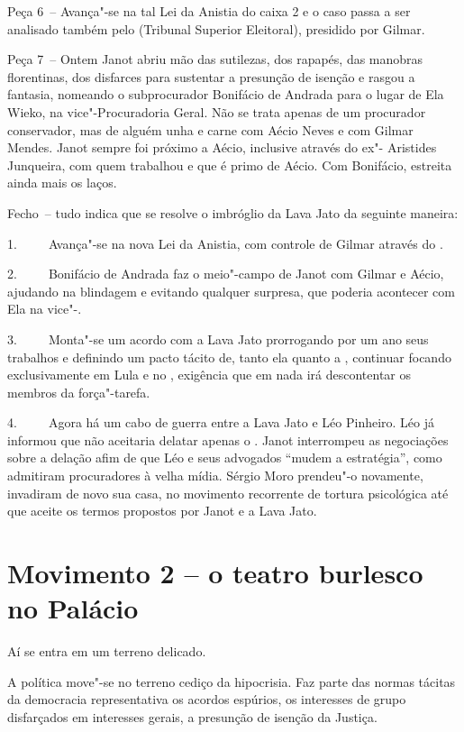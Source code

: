 Peça 6~-- Avança"-se na tal Lei da Anistia do caixa 2 e o caso passa a
ser analisado também pelo  (Tribunal Superior Eleitoral), presidido
por Gilmar.

Peça 7~-- Ontem Janot abriu mão das sutilezas, dos rapapés, das manobras
florentinas, dos disfarces para sustentar a presunção de isenção e
rasgou a fantasia, nomeando o subprocurador Bonifácio de Andrada para o
lugar de Ela Wieko, na vice"-Procuradoria Geral. Não se trata apenas de
um procurador conservador, mas de alguém unha e carne com Aécio Neves e
com Gilmar Mendes. Janot sempre foi próximo a Aécio, inclusive através
do ex"- Aristides Junqueira, com quem trabalhou e que é primo de
Aécio. Com Bonifácio, estreita ainda mais os laços.

Fecho~-- tudo indica que se resolve o imbróglio da Lava Jato da seguinte
maneira:

1.~~~~~Avança"-se na nova Lei da Anistia, com controle de Gilmar através
do .

2.~~~~~Bonifácio de Andrada faz o meio"-campo de Janot com Gilmar e
Aécio, ajudando na blindagem e evitando qualquer surpresa, que poderia
acontecer com Ela na vice"-.

3.~~~~~Monta"-se um acordo com a Lava Jato prorrogando por um ano seus
trabalhos e definindo um pacto tácito de, tanto ela quanto a ,
continuar focando exclusivamente em Lula e no , exigência que em nada
irá descontentar os membros da força"-tarefa.

4.~~~~~Agora há um cabo de guerra entre a Lava Jato e Léo Pinheiro. Léo
já informou que não aceitaria delatar apenas o . Janot interrompeu as
negociações sobre a delação afim de que Léo e seus advogados ``mudem a
estratégia'', como admitiram procuradores à velha mídia. Sérgio Moro
prendeu"-o novamente, invadiram de novo sua casa, no movimento recorrente
de tortura psicológica até que aceite os termos propostos por Janot e a
Lava Jato.

\section{Movimento 2 -- o teatro burlesco no Palácio}

Aí se entra em um terreno delicado.

A política move"-se no terreno cediço da hipocrisia. Faz parte das normas
tácitas da democracia representativa os acordos espúrios, os interesses
de grupo disfarçados em interesses gerais, a presunção de isenção da
Justiça.

